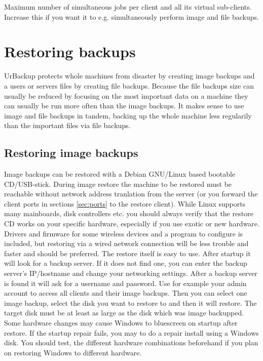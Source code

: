\documentclass[a4paper,10pt]{article}
\begin{document}
Maximum number of simultaneous jobs per client and all its virtual sub-clients. Increase this if you want it to e.g. simultaneously perform image and file backups.

\section{Restoring backups}

UrBackup protects whole machines from disaster by creating image backups and a users or servers files by creating file backups. Because the file backups size can usually be reduced by focusing on the most important data on a machine they can usually be run more often than the image backups. It makes sense to use image and file backups in tandem, backing up the whole machine less regularily than the important files via file backups.

\subsection{Restoring image backups}

Image backups can be restored with a Debian GNU/Linux based bootable CD/USB-stick. During image restore the machine to be restored must be reachable without network address tranlation from the server (or you forward the client ports in sections \ref{sec:ports} to the restore client).
While Linux supports many mainboards, disk controllers etc. you should always verify that the restore CD works on your specific hardware, especially if you use exotic or new hardware.
Drivers and firmware for some wireless devices and a program to configure is included, but restoring via a wired network connection will be less trouble and faster and should be preferred.
The restore itself is easy to use. After startup it will look for a backup server. If it does not find one, you can enter the backup server's IP/hostname and change your networking settings. After a backup server is found it will ask for a username and password. Use for example your admin account to access all clients and their image backups.
Then you can select one image backup, select the disk you want to restore to and then it will restore. The target disk must be at least as large as the disk which was image backupped.
Some hardware changes may cause Windows to bluescreen on startup after restore. If the startup repair fails, you may to do a repair install using a Windows disk. You should test, the different hardware combinations beforehand if you plan on restoring Windows to different hardware.
\end{document}
